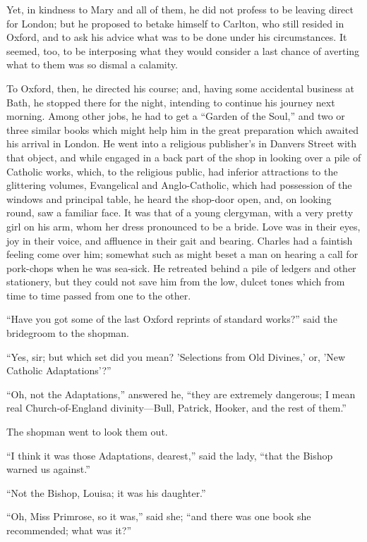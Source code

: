 Yet, in kindness to Mary and all of them, he did not profess to be
leaving direct for London; but he proposed to betake himself to
Carlton, who still resided in Oxford, and to ask his advice what was
to be done under his circumstances. It seemed, too, to be interposing
what they would consider a last chance of averting what to them was so
dismal a calamity.

To Oxford, then, he directed his course; and, having some
accidental business at Bath, he stopped there for the night, intending
to continue his journey next morning. Among other jobs, he had to get
a ``Garden of the Soul,'' and two or three similar books which
might help him in the great preparation which awaited his arrival in
London. He went into a religious publisher's in Danvers Street with
that object, and while engaged in a back part of the shop in looking
over a pile of Catholic works, which, to the religious public, had
inferior attractions to the glittering volumes, Evangelical and
Anglo-Catholic, which had possession of the windows and principal
table, he heard the shop-door open, and, on looking round, saw a
familiar face. It was that of a young clergyman, with a very pretty
girl on his arm, whom her dress pronounced to be a bride. Love was in
their eyes, joy in their voice, and affluence in their gait and
bearing. Charles had a faintish feeling come over him; somewhat such
as might beset a man on hearing a call for pork-chops when he was
sea-sick. He retreated behind a pile of ledgers and other stationery,
but they could not save him from the low, dulcet tones which from time
to time passed from one to the other.

``Have you got some of the last Oxford reprints of standard
works?'' said the bridegroom to the shopman.

``Yes, sir; but which set did you mean? 'Selections from Old
Divines,' or, 'New Catholic Adaptations'?''

``Oh, not the Adaptations,'' answered he, ``they are
extremely dangerous; I mean real Church-of-England divinity—Bull,
Patrick, Hooker, and the rest of them.''

The shopman went to look them out.

``I think it was those Adaptations, dearest,'' said the
lady, ``that the Bishop warned us against.''

``Not the Bishop, Louisa; it was his daughter.''

``Oh, Miss Primrose, so it was,'' said she; ``and there
was one book she recommended; what was it?''

